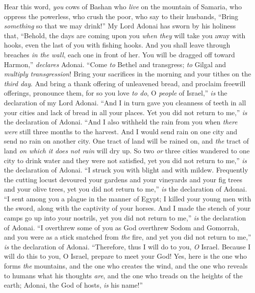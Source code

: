 \begin{biblechapter} %
 Hear this word, \textit{you} cows of Bashan who \textit{live} on the mountain of Samaria, who oppress the powerless, who crush the poor, who say to their husbands, “Bring \textit{something} so that we may drink!”
\verse My Lord Adonai has sworn by his holiness that, “Behold, the days are coming upon you \textit{when they} will take you away with hooks, even the last of you with fishing hooks.
\verse And you shall leave through breaches \textit{in the wall}, each one in front of her. You will be dragged off toward Harmon,” \textit{declares} Adonai.
\verse “Come \textit{to} Bethel and transgress; \textit{to} Gilgal and \textit{multiply transgression}! Bring your sacrifices in the morning and your tithes on the \textit{third day}.
\verse And bring a thank offering of unleavened bread, and proclaim freewill offerings, pronounce them, for so you love \textit{to do}, O \textit{people} of Israel,” \textit{is} the declaration of my Lord Adonai.
\verse “And I in turn gave you cleanness of teeth in all your cities and lack of bread in all your places. Yet you did not return to me,” \textit{is} the declaration of Adonai.
\verse “And I also withheld the rain from you when \textit{there were} still three months to the harvest. And I would send rain on one city and send no rain on another city. One tract of land will be rained on, and \textit{the} tract of land \textit{on which it does not rain} will dry up.
\verse So two \textit{or} three cities wandered to one city to drink water and they were not satisfied, yet you did not return to me,” \textit{is} the declaration of Adonai.
\verse “I struck you with blight and with mildew. Frequently the cutting locust devoured your gardens and your vineyards and your fig trees and your olive trees, yet you did not return to me,” \textit{is} the declaration of Adonai.
\verse “I sent among you a plague in the manner of Egypt; I killed your young men with the sword, along with the captivity of your horses. And I made the stench of your camps go up into your nostrils, yet you did not return to me,” \textit{is} the declaration of Adonai.
\verse “I overthrew some of you as God overthrew Sodom and Gomorrah, and you were as a stick snatched from \textit{the} fire, and yet you did not return to me,” \textit{is} the declaration of Adonai.
\verse “Therefore, thus I will do to you, \textit{O} Israel. Because I will do this to you, O Israel, prepare to meet your God!
\verse Yes, here is the one who forms \textit{the} mountains, and the one who creates the wind, and the one who reveals to humans what his thoughts \textit{are}, and the one who treads on the heights of the earth; Adonai, the God of hosts, \textit{is} his name!”
\end{biblechapter}

